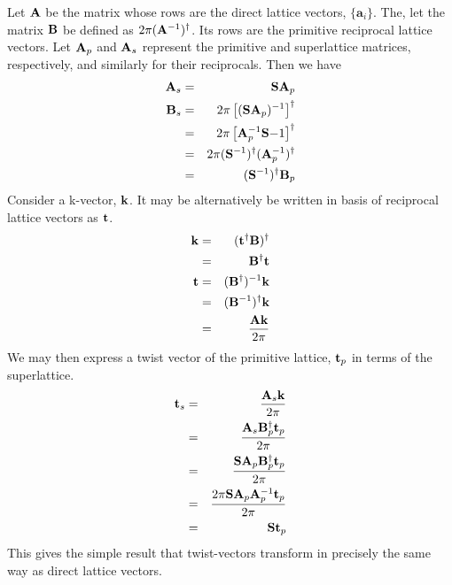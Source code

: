\documentclass{article}
\begin{document}
Let $\mathbf{A}$ be the matrix whose rows are the direct lattice vectors,
$\{\mathbf{a}_i\}$.  The, let the matrix $\mathbf{B}$ be defined as
$2\pi(\mathbf{A}^{-1})^\dagger$.  Its rows are the primitive reciprocal
lattice vectors.  Let $\mathbf{A}_p$ and $\mathbf{A}_s$ represent the primitive
and superlattice matrices, respectively, and similarly for their
reciprocals.  Then we have
\begin{eqnarray}
\mathbf{A}_s & = & \mathbf{S} \mathbf{A}_p \\
\mathbf{B}_s & = & 2\pi\left[(\mathbf{S} \mathbf{A}_p)^{-1}\right]^\dagger \\
        & = & 2\pi\left[\mathbf{A}_p^{-1} \mathbf{S}{-1}\right]^\dagger \\
        & = & 2\pi(\mathbf{S}^{-1})^\dagger (\mathbf{A}_p^{-1})^\dagger \\
        & = & (\mathbf{S}^{-1})^\dagger \mathbf{B}_p
\end{eqnarray}  
Consider a k-vector, $\mathbf{k}$.  It may be alternatively be written in
basis of reciprocal lattice vectors as $\mathbf{t}$.  
\begin{eqnarray}
\mathbf{k} & = & (\mathbf{t}^\dagger \mathbf{B})^\dagger \\
    & = & \mathbf{B}^\dagger \mathbf{t}           \\
\mathbf{t} & = & (\mathbf{B}^\dagger)^{-1} \mathbf{k}    \\
    & = & (\mathbf{B}^{-1})^\dagger \mathbf{k}    \\
    & = & \frac{\mathbf{A} \mathbf{k}}{2\pi}
\end{eqnarray}
We may then express a twist vector of the primitive lattice, $\mathbf{t}_p$ in terms
of the superlattice.
\begin{eqnarray}
\mathbf{t}_s & = & \frac{\mathbf{A}_s \mathbf{k}}{2\pi}                           \\
      & = & \frac{\mathbf{A}_s \mathbf{B}_p^\dagger \mathbf{t}_p}{2\pi}         \\
      & = & \frac{\mathbf{S} \mathbf{A}_p \mathbf{B}_p^\dagger \mathbf{t}_p}{2\pi}   \\
      & = & \frac{2\pi \mathbf{S} \mathbf{A}_p \mathbf{A}_p^{-1} \mathbf{t}_p}{2\pi} \\
      & = & \mathbf{S} \mathbf{t}_p
\end{eqnarray}
This gives the simple result that twist-vectors transform in precisely
the same way as direct lattice vectors.
\end{document}
